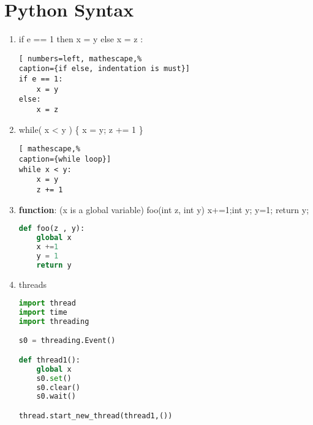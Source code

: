 \chapter{Python Syntax}
\label{ch:thread}
\begin{enumerate}
\item if e == 1 then x = y else x = z : \\
\begin{lstlisting}[ numbers=left, mathescape,%
caption={if else, indentation is must}]
if e == 1:
	x = y
else:
	x = z 
\end{lstlisting} 

\item while( x < y ) \{ x = y; z += 1 \} 
\begin{lstlisting}[ mathescape,%
caption={while loop}]
while x < y:
	x = y
	z += 1
\end{lstlisting}
\item \textbf{function}: (x is a global variable) foo(int z, int y) { x+=1;int y; y=1; return y; }
\begin{lstlisting}[language=Python, caption=threads]
def foo(z , y):
	global x
	x +=1
	y = 1
	return y
\end{lstlisting}

\item threads
\begin{lstlisting}[language=Python, caption=threads]
import thread
import time
import threading

s0 = threading.Event()

def thread1():
	global x
	s0.set()
	s0.clear()
	s0.wait()

thread.start_new_thread(thread1,())
\end{lstlisting}

\end{enumerate}